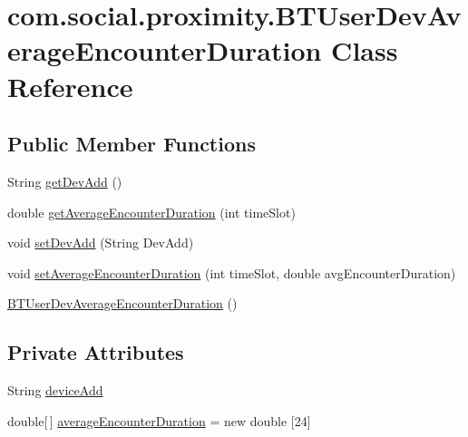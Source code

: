 \hypertarget{classcom_1_1social_1_1proximity_1_1_b_t_user_dev_average_encounter_duration}{}\section{com.\+social.\+proximity.\+B\+T\+User\+Dev\+Average\+Encounter\+Duration Class Reference}
\label{classcom_1_1social_1_1proximity_1_1_b_t_user_dev_average_encounter_duration}
\subsection*{Public Member Functions}
\begin{DoxyCompactItemize}
\item 
String \hyperlink{classcom_1_1social_1_1proximity_1_1_b_t_user_dev_average_encounter_duration_ae30f7fd1b052777a762cd5916ff90a0c}{get\+Dev\+Add} ()
\item 
double \hyperlink{classcom_1_1social_1_1proximity_1_1_b_t_user_dev_average_encounter_duration_a5d8b4673d3c0157556453356ad5697c9}{get\+Average\+Encounter\+Duration} (int time\+Slot)
\item 
void \hyperlink{classcom_1_1social_1_1proximity_1_1_b_t_user_dev_average_encounter_duration_a8eb6d5a171327e2fba48ea158c56cf3a}{set\+Dev\+Add} (String Dev\+Add)
\item 
void \hyperlink{classcom_1_1social_1_1proximity_1_1_b_t_user_dev_average_encounter_duration_ad8a9abe83e51f409bad066be57a9c45f}{set\+Average\+Encounter\+Duration} (int time\+Slot, double avg\+Encounter\+Duration)
\item 
\hyperlink{classcom_1_1social_1_1proximity_1_1_b_t_user_dev_average_encounter_duration_ace8375101bdc930690093b29a7764a3b}{B\+T\+User\+Dev\+Average\+Encounter\+Duration} ()
\end{DoxyCompactItemize}
\subsection*{Private Attributes}
\begin{DoxyCompactItemize}
\item 
String \hyperlink{classcom_1_1social_1_1proximity_1_1_b_t_user_dev_average_encounter_duration_a7161e8fe284b7c496386bddab669b7a0}{device\+Add}
\item 
double\mbox{[}$\,$\mbox{]} \hyperlink{classcom_1_1social_1_1proximity_1_1_b_t_user_dev_average_encounter_duration_a72d8edbf20fdcc400ea6093084b03887}{average\+Encounter\+Duration} = new double \mbox{[}24\mbox{]}
\end{DoxyCompactItemize}


